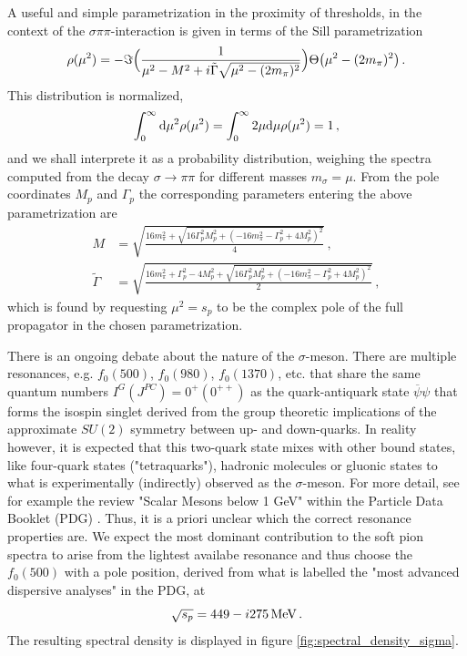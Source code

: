 A useful and simple parametrization in the proximity of thresholds, in the context of the $\sigma\pi\pi$-interaction is given in terms of the Sill parametrization \cite{GiacosaEtAl_2021}
\begin{equation}
    \rho(\mu^2)=-\Im\Big(\frac{1}{\mu^2-M^2+{i}\tilde{\Gamma}\sqrt{\mu^2-(2m_\pi)^2}}\Big)\Theta\big(\mu^2-(2m_\pi)^2\big)\,.
\end{equation}
This distribution is normalized,
\begin{equation}
    \int_0^\infty\text{d}\mu^2\rho(\mu^2)=\int_0^\infty 2\mu\text{d}\mu\rho(\mu^2)=1\,,
\end{equation}
and we shall interprete it as a probability distribution, weighing the spectra computed from the decay ${\sigma\to\pi\pi}$ for different masses $m_\sigma=\mu$. From the pole coordinates $M_p$ and $\Gamma_p$ the corresponding parameters entering the above parametrization are
\begin{subequations}
    \begin{align}
        M&=\sqrt{\frac{16 m_\pi^2+\sqrt{16\Gamma_p^2M_p^2+(-16 m_\pi^2-\Gamma_p^2+4M_p^2)^2}}{4}}\,,\\
        \tilde{\Gamma}&=\sqrt{\frac{16 m_\pi^2+\Gamma_p^2-4 M_p^2+\sqrt{16\Gamma_p^2M_p^2+(-16 m_\pi^2-\Gamma_p^2+4M_p^2)^2}}{2}}\,,
    \end{align}
\end{subequations}
which is found by requesting ${\mu^2=s_p}$ to be the complex pole of the full propagator in the chosen parametrization.

There is an ongoing debate about the nature of the $\sigma$-meson. There are multiple resonances, e.g. $f_0(500)$, $f_0(980)$, $f_0(1370)$, etc. that share the same quantum numbers ${I^G(J^{PC})=0^+(0^{++})}$ as the quark-antiquark state ${\overline{\psi}\psi}$ that forms the isospin singlet derived from the group theoretic implications of the approximate $SU(2)$ symmetry between up- and down-quarks. In reality however, it is expected that this two-quark state mixes with other bound states, like four-quark states ("tetraquarks"), hadronic molecules or gluonic states to what is experimentally (indirectly) observed as the $\sigma$-meson. For more detail, see for example the review "Scalar Mesons below 1 GeV" within the Particle Data Booklet (PDG) \cite{Navasothers_2024}. Thus, it is a priori unclear which the correct resonance properties are. We expect the most dominant contribution to the soft pion spectra to arise from the lightest availabe resonance and thus choose the $f_0(500)$ with a pole position, derived from what is labelled the "most advanced dispersive analyses" \cite{Navasothers_2024} in the PDG, at
\begin{equation}
    \sqrt{s_p}=449-{i} 275\,\text{MeV}\,.
\end{equation}
The resulting spectral density is displayed in figure \ref{fig:spectral_density_sigma}.

